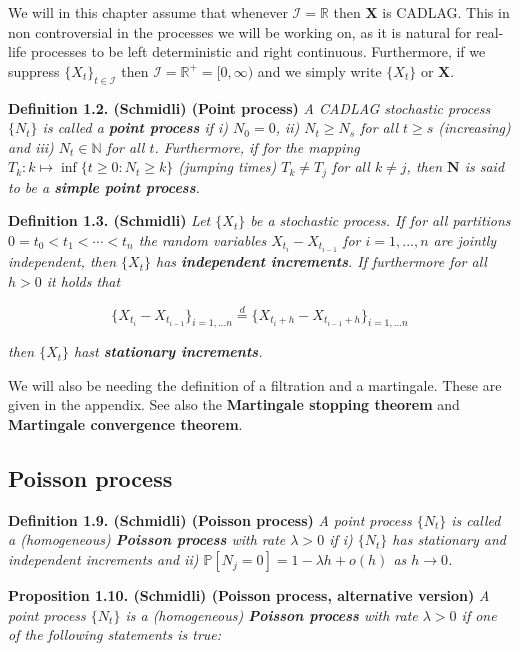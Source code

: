 \documentclass[a4paper,10pt,openany]{book}
\begin{document}
We will in this chapter assume that whenever \(\mathcal I=\mathbb R\) then \(\mathbf X\) is CADLAG. This in non controversial in the processes we will be working on, as it is natural for real-life processes to be left deterministic and right continuous. Furthermore, if we suppress \(\{X_t\}_{t\in \mathcal I}\) then \(\mathcal I=\mathbb R^+=[0,\infty)\) and we simply write \(\{X_t\}\) or \(\mathbf X\).

\textbf{Definition 1.2. (Schmidli) (Point process)} \emph{A CADLAG stochastic process \(\{N_t\}\) is called a \textbf{point process} if i) \(N_0=0\), ii) \(N_t\ge N_s\) for all \(t\ge s\) (increasing) and iii) \(N_t\in \mathbb N\) for all \(t\). Furthermore, if for the mapping \(T_k : k\mapsto\inf\{t\ge 0 : N_t\ge k\}\) (jumping times) \(T_k\ne T_j\) for all \(k\ne j\), then \(\mathbf N\) is said to be a \textbf{simple point process}.}

\textbf{Definition 1.3. (Schmidli)} \emph{Let \(\{X_t\}\) be a stochastic process. If for all partitions \(0=t_0<t_1<\cdots<t_n\) the random variables \(X_{t_i}-X_{t_{i-1}}\) for \(i=1,...,n\) are jointly independent, then \(\{X_t\}\) has \textbf{independent increments}. If furthermore for all \(h>0\) it holds that}

\[
\{X_{t_i}-X_{t_{i-1}}\}_{i=1,...n}\stackrel{d}{=}\{X_{t_i+h}-X_{t_{i-1}+h}\}_{i=1,...n}
\]

\emph{then \(\{X_t\}\) hast \textbf{stationary increments}.}

We will also be needing the definition of a filtration and a martingale. These are given in the appendix. See also the \textbf{Martingale stopping theorem} and \textbf{Martingale convergence theorem}.

\hypertarget{poisson-process}{%
\subsection{Poisson process}\label{poisson-process}}

\textbf{Definition 1.9. (Schmidli) (Poisson process)} \emph{A point process \(\{N_t\}\) is called a (homogeneous) \textbf{Poisson process} with rate \(\lambda >0\) if i) \(\{N_t\}\) has stationary and independent increments and ii) \(\mathbb P[N_j=0]=1-\lambda h+o(h)\) as \(h\to 0\).}

\textbf{Proposition 1.10. (Schmidli) (Poisson process, alternative version)} \emph{A point process \(\{N_t\}\) is a (homogeneous) \textbf{Poisson process} with rate \(\lambda >0\) if one of the following statements is true:}
\end{document}
